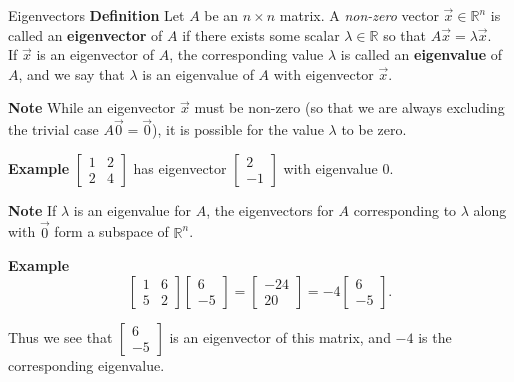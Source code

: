   \begin{frame}[fragile]{Eigenvectors}
 \textbf{Definition}
 Let $A$ be an $n \times n$ matrix.  A {\em non-zero} vector $\vec{x}\in \mathbb R^n$ is 
called an \textbf{eigenvector} of $A$ if there exists some scalar $\lambda \in \mathbb R$ so that 
$A \vec{x}= \lambda \vec{x}$.  \\ 
 If $\vec{x}$ is an eigenvector of $A$,
the corresponding value $\lambda$ is called an \textbf{eigenvalue} of $A$, and we say that 
$\lambda$ is an eigenvalue of $A$ with eigenvector $\vec{x}$.  



\textbf{Note}
While an eigenvector $\vec{x}$ must be non-zero (so that we are always 
excluding the trivial case $A \vec{0}=\vec{0}$), it is possible for the value
$\lambda$ to be zero. 



\textbf{Example}
$\left[ \begin{array}{rrrrr} 1 & 2 \\ 2 & 4 \end{array} \right]$
has eigenvector $\left[ \begin{array}{rrrrr}2 \\-1 \end{array} \right]$ with eigenvalue $0$.

\end{frame}




  \begin{frame}[fragile]
\textbf{Note}
 If $\lambda$ is an eigenvalue for $A$, the eigenvectors for $A$ corresponding to $\lambda$ along with $\vec{0}$ form a subspace of $\mathbb R^n$.



 \textbf{Example}
 \[
 \left[ \begin{array}{rrrrr} 
  1 & 6 \\ 5 & 2
 \end{array} \right]
 \left[ \begin{array}{rrrrr} 
  6 \\-5 
 \end{array} \right]
=
 \left[ \begin{array}{rrrrr} 
  -24 \\ 20
 \end{array} \right]
=
-4 \left[ \begin{array}{rrrrr} 
  6 \\ -5
 \end{array} \right].
\]


Thus we see that $\left[ \begin{array}{rrrrr} 
  6 \\ -5
 \end{array} \right]$ is an eigenvector of this matrix, and $-4$ is the corresponding eigenvalue.

 
\end{frame}



